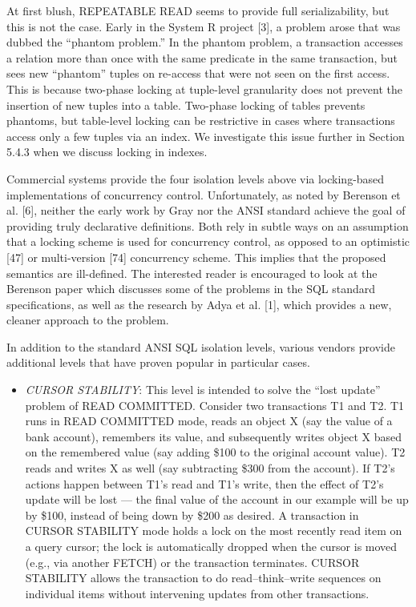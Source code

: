 \documentclass[a4paper,11pt,twoside,openright]{book}
\begin{document}
At first blush, REPEATABLE READ seems to provide full serializability,
but this is not the case. Early in the System R project {[}3{]}, a
problem arose that was dubbed the ``phantom problem.'' In the phantom
problem, a transaction accesses a relation more than once with the same
predicate in the same transaction, but sees new ``phantom'' tuples on
re-access that were not seen on the first access. This is because
two-phase locking at tuple-level granularity does not prevent the
insertion of new tuples into a table. Two-phase locking of tables
prevents phantoms, but table-level locking can be restrictive in cases
where transactions access only a few tuples via an index. We investigate
this issue further in Section 5.4.3 when we discuss locking in indexes.

Commercial systems provide the four isolation levels above via
locking-based implementations of concurrency control. Unfortunately, as
noted by Berenson et al. {[}6{]}, neither the early work by Gray nor the
ANSI standard achieve the goal of providing truly declarative
definitions. Both rely in subtle ways on an assumption that a locking
scheme is used for concurrency control, as opposed to an optimistic
{[}47{]} or multi-version {[}74{]} concurrency scheme. This implies that
the proposed semantics are ill-defined. The interested reader is
encouraged to look at the Berenson paper which discusses some of the
problems in the SQL standard specifications, as well as the research by
Adya et al. {[}1{]}, which provides a new, cleaner approach to the
problem.

In addition to the standard ANSI SQL isolation levels, various vendors
provide additional levels that have proven popular in particular cases.

\begin{itemize}

\item
  \emph{CURSOR STABILITY}: This level is intended to solve the ``lost
  update'' problem of READ COMMITTED. Consider two transactions T1 and
  T2. T1 runs in READ COMMITTED mode, reads an object X (say the value
  of a bank account), remembers its value, and subsequently writes
  object X based on the remembered value (say adding \$100 to the
  original account value). T2 reads and writes X as well (say
  subtracting \$300 from the account). If T2's actions happen between
  T1's read and T1's write, then the effect of T2's update will be lost
  --- the final value of the account in our example will be up by \$100,
  instead of being down by \$200 as desired. A transaction in CURSOR
  STABILITY mode holds a lock on the most recently read item on a query
  cursor; the lock is automatically dropped when the cursor is moved
  (e.g., via another FETCH) or the transaction terminates. CURSOR
  STABILITY allows the transaction to do read--think--write sequences
  on individual items without intervening updates from other
  transactions.
\end{itemize}
\end{document}
